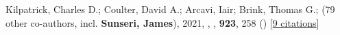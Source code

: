 \item Kilpatrick, Charles D.; Coulter, David A.; Arcavi, Iair; Brink, Thomas G.; \etal ({79} other co-authors, incl. \textbf{Sunseri, James}), 2021, , \apj, \textbf{923}, 258 () [\href{https://ui.adsabs.harvard.edu/abs/2021ApJ...923..258K}{9 citations}]

